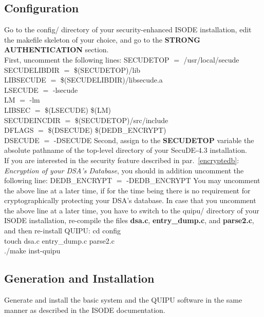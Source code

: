 \subsection{Configuration}
Go to the config/ directory of your security-enhanced ISODE installation, edit the makefile 
skeleton of your choice, and go to the {\bf STRONG AUTHENTICATION} section.
\\ [1em]
First, uncomment the following lines:
\bvtab
\1 SECUDETOP  $=$  /usr/local/secude \\
\1 SECUDELIBDIR  $=$  \$(SECUDETOP)/lib \\
\1 LIBSECUDE  $=$  \$(SECUDELIBDIR)/libsecude.a \\
\1 LSECUDE  $=$  -lsecude \\
\1 LM  $=$  -lm \\
\1 LIBSEC  $=$  \$(LSECUDE) \$(LM) \\
\1 SECUDEINCDIR  $=$  \$(SECUDETOP)/src/include \\
\1 DFLAGS  $=$  \$(DSECUDE) \$(DEDB\_ENCRYPT) \\
\1 DSECUDE  $=$  -DSECUDE 
\evtab
Second, assign to the {\bf SECUDETOP} variable the absolute pathname of the top-level directory 
of your SecuDE-4.3 installation.
\\ [1em]
If you are interested in the security feature described in par.~\ref{encryptedb}:
{\em Encryption of your DSA's Database}, you should in addition uncomment the following line:
\bvtab
\1 DEDB\_ENCRYPT  $=$  -DEDB\_ENCRYPT
\evtab
You may uncomment the above line at a later time, if for the time being there is no requirement
for cryptographically protecting your DSA's database.
In case that you uncomment the above line at a later time, you have to switch to the quipu/ directory 
of your ISODE installation, re-compile the files
{\bf dsa.c}, {\bf entry\_dump.c}, and {\bf parse2.c}, and then re-install QUIPU:
\bvtab
\1 cd config \\
\1 touch dsa.c entry\_dump.c parse2.c \\
\1 ./make inst-quipu
\evtab


\subsection{Generation and Installation}
Generate and install the basic system and the QUIPU software in the same manner as described in the
ISODE documentation.



